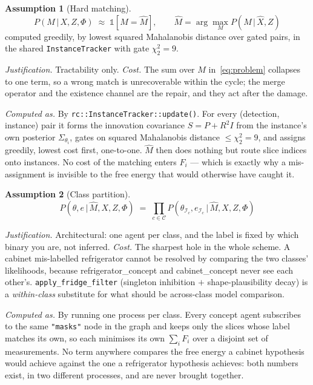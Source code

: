 \documentclass[11pt,a4paper]{report}
\newcommand{\given}{\,|\,}
\theoremstyle{definition}   %
\newtheorem{assumption}{Assumption}
\begin{document}
\begin{assumption}[Hard matching]\label{as:hard}
\begin{equation}
P(M\given X,Z,\Phi)\;\approx\;\mathbb{1}\!\left[M=\hat M\right],
\qquad
\hat M=\arg\max_M P(M\given \hat X,Z)
\end{equation}
computed greedily, by lowest squared Mahalanobis distance over gated pairs, in the shared
\texttt{InstanceTracker} with gate $\chi^2_2=9$.
\end{assumption}
\noindent\textit{Justification.} Tractability only. \textit{Cost.} The sum over $M$
in~\eqref{eq:problem} collapses to one term, so a wrong match is unrecoverable within the cycle;
the merge operator and the existence channel are the repair, and they act after the damage.


\smallskip\noindent\textit{Computed as.} By \texttt{rc::InstanceTracker::update()}. For every (detection, instance) pair it forms the
innovation covariance $S=P+R^2I$ from the instance's own posterior $\Sigma_{\theta_i}$, gates on
squared Mahalanobis distance $\le\chi^2_2=9$, and assigns greedily, lowest cost first, one-to-one.
$\hat M$ then does nothing but route slice indices onto instances. No cost of the matching enters
$F_i$ --- which is exactly why a mis-assignment is invisible to the free energy that would
otherwise have caught it.

\begin{assumption}[Class partition]\label{as:class}
\begin{equation}
P(\theta,e\given \hat M,X,Z,\Phi)\;=\;\prod_{c\in\mathcal{C}}
P\!\left(\theta_{\mathcal{I}_c},e_{\mathcal{I}_c}\given \hat M,X,Z,\Phi\right)
\end{equation}
\end{assumption}
\noindent\textit{Justification.} Architectural: one agent per class, and the label is fixed by
which binary you are, not inferred. \textit{Cost.} The sharpest hole in the whole scheme. A
cabinet mis-labelled \textsf{refrigerator} cannot be resolved by comparing the two classes'
likelihoods, because \textsf{refrigerator\_concept} and \textsf{cabinet\_concept} never see each
other's. \texttt{apply\_fridge\_filter} (singleton inhibition $+$ shape-plausibility decay) is a
\emph{within-class} substitute for what should be across-class model comparison.


\smallskip\noindent\textit{Computed as.} By running one process per class. Every concept agent subscribes to the same \texttt{"masks"}
node in the graph and keeps only the slices whose label matches its own, so each minimises its own
$\sum_i F_i$ over a disjoint set of measurements. No term anywhere compares the free energy a
cabinet hypothesis would achieve against the one a refrigerator hypothesis achieves: both numbers
exist, in two different processes, and are never brought together.
\end{document}
